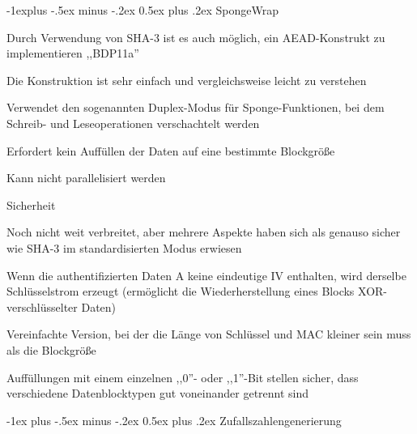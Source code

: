 \documentclass[a4paper]{article}
\makeatletter
\renewcommand{\section}{\@startsection{section}{1}{0mm}%
 {-1ex plus -.5ex minus -.2ex}%
 {0.5ex plus .2ex}%
 {\normalfont\large\bfseries}}
\renewcommand{\subsection}{\@startsection{subsection}{2}{0mm}%
 {-1explus -.5ex minus -.2ex}%
 {0.5ex plus .2ex}%
 {\normalfont\normalsize\bfseries}}
\makeatother
\begin{document}
\begin{multicols}{3}
      \subsection{SpongeWrap}
      \begin{itemize*}
            \item Durch Verwendung von SHA-3 ist es auch möglich, ein AEAD-Konstrukt zu implementieren ,,BDP11a''
            \item Die Konstruktion ist sehr einfach und vergleichsweise leicht zu verstehen
            \item Verwendet den sogenannten Duplex-Modus für Sponge-Funktionen, bei dem Schreib- und Leseoperationen verschachtelt werden
            \item Erfordert kein Auffüllen der Daten auf eine bestimmte Blockgröße
            \item Kann nicht parallelisiert werden
            \item Sicherheit
            \begin{itemize*}
                  \item Noch nicht weit verbreitet, aber mehrere Aspekte haben sich als genauso sicher wie SHA-3 im standardisierten Modus erwiesen
                  \item Wenn die authentifizierten Daten A keine eindeutige IV enthalten, wird derselbe Schlüsselstrom erzeugt (ermöglicht die Wiederherstellung eines Blocks XOR-verschlüsselter Daten)
                  \item Vereinfachte Version, bei der die Länge von Schlüssel und MAC kleiner sein muss als die Blockgröße
                  \item Auffüllungen mit einem einzelnen ,,0''- oder ,,1''-Bit stellen sicher, dass verschiedene Datenblocktypen gut voneinander getrennt sind
            \end{itemize*}
      \end{itemize*}

      \section{Zufallszahlengenerierung}

\end{multicols}
\end{document}
